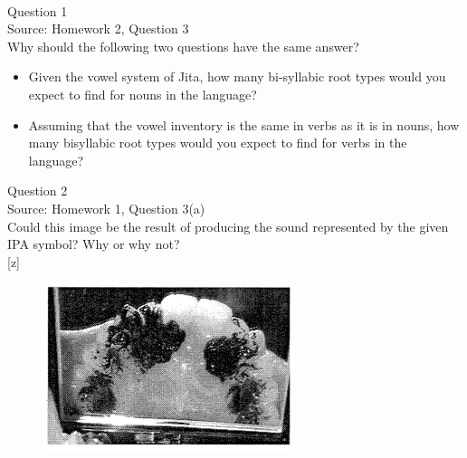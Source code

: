 \documentclass[12pt]{article}
\begin{document}
\newpage

\begin{center}
\textbf{{\color{red}{\HUGE END OF EXAM}}}\\

\end{center}
\newpage

\begin{center}
\textbf{{\color{blue}{\HUGE START OF EXAM\\}}}

\textbf{{\color{blue}{\HUGE Student ID: 51967\\}}}

\textbf{{\color{blue}{\HUGE 4:10\\}}}

\end{center}
\newpage

{\large Question 1}\\

Source: Homework 2, Question 3\\

Why should the following two questions have the same answer?\\

\begin{itemize} \item Given the vowel system of Jita, how many bi-syllabic root types would you expect to find for nouns in the language? \item Assuming that the vowel inventory is the same in verbs as it is in nouns, how many bisyllabic root types would you expect to find for verbs in the language? \end{itemize}


\newpage

{\large Question 2}\\

Source: Homework 1, Question 3(a)\\

Could this image be the result of producing the sound represented by the given IPA symbol? Why or why not?\\

{[z]}

\begin{figure}[H]
\includegraphics{../images/staticpalatography_fricative.png}
\end{figure}
\end{document}
